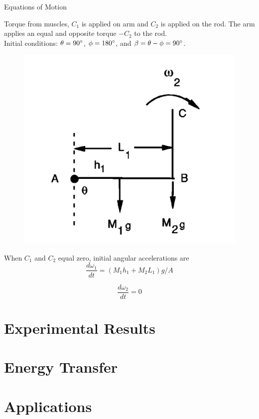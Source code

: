 \documentclass[tikz]{beamer}
\begin{document}
\begin{frame} {Equations of Motion}
	\only<4> {
		Torque from muscles, $C_1$ is applied on arm and $C_2$ is applied on the rod. The arm applies an equal and opposite torque $-C_2$ to the rod. \\
		Initial conditions: $\theta = 90\degree$, $\phi = 180\degree$, and $\beta = \theta - \phi = 90\degree$.

		\begin{figure}
			\centering
			\includegraphics[scale=0.4]{wristcock.png}
		\end{figure}
	}

	 {
		When $C_1$ and $C_2$ equal zero, initial angular accelerations are
		\begin{equation}
			\frac{d \omega_1}{dt} = (M_1 h_1 + M_2 L_1)g/A \tag{6}
		\end{equation}

		\begin{equation}
			\frac{d \omega_2}{dt} = 0 \tag{7}
		\end{equation}
	}

\end{frame}


\section{Experimental Results}

\section{Energy Transfer}

\section{Applications}

\end{document}
